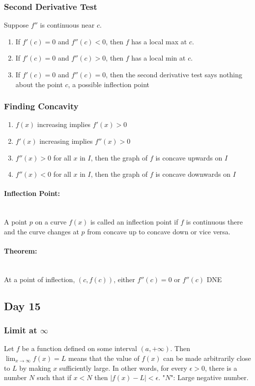 \documentclass[12pt]{article}
\newcommand{\paragraphNewLine}[1]{\paragraph{#1}\mbox{}\\}
\begin{document}
\subsubsection{Second Derivative Test} Suppose $f''$ is continuous near $c$. 
\begin{enumerate}
    \item If $f'(c) = 0$ and $f''(c) < 0$, then $f$ has a local max at $c$.
    \item If $f'(c) = 0$ and $f''(c) > 0$, then $f$ has a local min at $c$.
    \item If $f'(c) = 0$ and $f''(c) = 0$, then the second derivative test says nothing about the point $c$, a possible inflection point
\end{enumerate}
\subsubsection{Finding Concavity}
\begin{enumerate}
    \item $f(x)$ increasing implies $f'(x)>0$
    \item $f'(x)$ increasing implies $f''(x)>0$
    \item $f''(x)>0$ for all $x$ in $I$, then the graph of $f$ is concave upwards on $I$
    \item $f''(x)<0$ for all $x$ in $I$, then the graph of $f$ is concave downwards on $I$
\end{enumerate}

\paragraphNewLine{Inflection Point:} A point $p$ on a curve $f(x)$ is called an inflection point if $f$ is continuous there and the curve changes at $p$ from concave up to concave down or vice versa.

\paragraphNewLine{Theorem:} At a point of inflection, $(c, f(c))$, either $f''(c)=0$ or $f''(c)$ DNE

\subsection{Day 15}
\subsubsection{Limit at $\infty{}$} Let $f$ be a function defined on some interval $(a, +\infty{})$. Then $\lim_{x \to \infty{}} f(x) = L$ means that the value of $f(x)$ can be made arbitrarily close to $L$ by making $x$ sufficiently large. In other words, for every $\epsilon > 0$, there is a number $N$ such that if $x<N$ then $|f(x)-L| < \epsilon$. "$N$": Large negative number.
\end{document}
